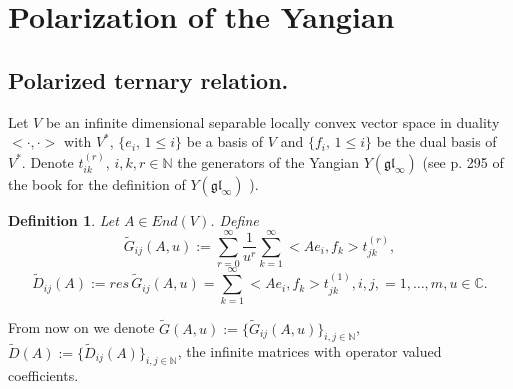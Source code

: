 \documentclass[10pt]{article}%
\numberwithin{equation}{section}
\newtheorem{defin}[thm]{Definition}
\newcommand{\gl}{{\mathfrak{gl}}}
\begin{document}



\section{Polarization of the Yangian}\label{sec:Polarization}

\subsection{Polarized ternary relation.}
Let $V$ be an infinite dimensional separable locally convex vector space  in duality $<\cdot,\cdot>$ with $V^{*}$, $\{e_i, \, 1\leq i\}$  be a basis of $V$ and $\{f_i, \, 1\leq i\}$ be the dual basis of $V^{*}$. Denote  $t^{(r)}_{ik}$, $ i,k,r\in\mathbb{N}$ the generators of the Yangian $Y(\gl_{\infty})$ (see p. 295 of the book \cite{Molevbook} for the definition of $Y(\gl_{\infty})$ ).

\begin{defin} 
Let $A\in End(V)$.
Define
\begin{equation}\label{eqn:Gdef}
\widetilde{G}_{ij}(A,u):=\sum\limits_{r=0}^{\infty}\frac{1}{u^r}\sum\limits_{k=1}^{\infty} <Ae_{i},f_{k}> t^{(r)}_{jk},
\end{equation}
\begin{equation}\label{eqn:JSdef}
\widetilde{D}_{ij}(A):=res\, \widetilde{G}_{ij}(A,u)=\sum\limits_{k=1}^{\infty} <Ae_{i},f_{k}> t^{(1)}_{jk},i,j,=1,\ldots,m,u\in\mathbb{C}.
\end{equation}
\end{defin}

From now on we denote $\widetilde{G}(A,u):=\{\widetilde{G}_{ij}(A,u)\}_{i,j\in\mathbb{N}}$, $\widetilde{D}(A):=\{\widetilde{D}_{ij}(A)\}_{i,j\in\mathbb{N}}$, the infinite matrices with operator valued coefficients.
\end{document}
